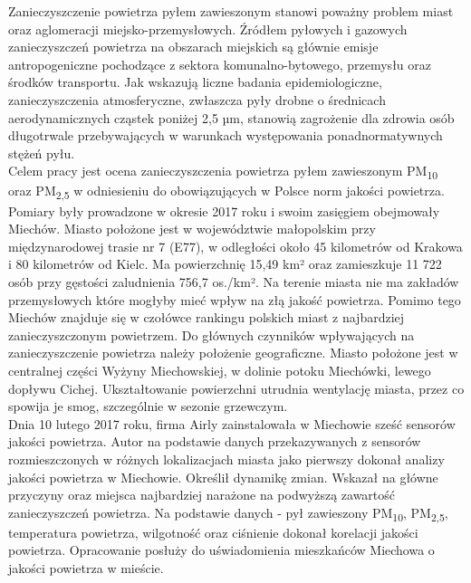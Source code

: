 \documentclass[\main/boa.tex]{subfiles}
\begin{document}
Zanieczyszczenie powietrza pyłem zawieszonym stanowi poważny problem miast oraz aglomeracji miejsko-przemysłowych. Źródłem pyłowych i gazowych zanieczyszczeń powietrza na obszarach miejskich są głównie emisje antropogeniczne pochodzące z sektora komunalno-bytowego, przemysłu oraz środków transportu. Jak wskazują liczne badania epidemiologiczne, zanieczyszczenia atmosferyczne, zwłaszcza pyły drobne o średnicach aerodynamicznych cząstek poniżej 2,5 µm, stanowią zagrożenie dla zdrowia osób długotrwale przebywających w warunkach występowania ponadnormatywnych stężeń pyłu.\\
Celem pracy jest ocena zanieczyszczenia powietrza pyłem zawieszonym PM\textsubscript{10} oraz PM\textsubscript{2,5}  w odniesieniu do obowiązujących w Polsce norm jakości powietrza. Pomiary były prowadzone w okresie 2017 roku i swoim zasięgiem obejmowały Miechów. Miasto położone jest w województwie małopolskim przy międzynarodowej trasie nr 7 (E77), w odległości około 45 kilometrów od Krakowa i 80 kilometrów od Kielc. Ma powierzchnię 15,49 km² oraz zamieszkuje 11 722 osób przy gęstości zaludnienia 756,7 os./km². Na terenie miasta nie ma zakładów przemysłowych które mogłyby mieć wpływ na złą jakość powietrza. Pomimo tego Miechów znajduje się w czołówce rankingu polskich miast z najbardziej zanieczyszczonym powietrzem. Do głównych czynników wpływających na zanieczyszczenie powietrza należy położenie geograficzne. Miasto położone jest w centralnej części Wyżyny Miechowskiej, w dolinie potoku Miechówki, lewego dopływu Cichej. Ukształtowanie powierzchni utrudnia wentylację miasta, przez co spowija je smog, szczególnie w sezonie grzewczym. \\
Dnia 10 lutego 2017 roku, firma Airly zainstalowała w Miechowie sześć sensorów jakości powietrza. Autor na podstawie danych przekazywanych z sensorów rozmieszczonych w różnych lokalizacjach miasta jako pierwszy dokonał analizy jakości powietrza w Miechowie. Określił dynamikę zmian. Wskazał na główne przyczyny oraz miejsca najbardziej narażone na podwyższą zawartość zanieczyszczeń powietrza. Na podstawie danych - pył zawieszony PM\textsubscript{10}, PM\textsubscript{2,5}, temperatura powietrza, wilgotność oraz ciśnienie dokonał korelacji jakości powietrza. Opracowanie posłuży do uświadomienia mieszkańców Miechowa o jakości powietrza w mieście.
\end{document}

